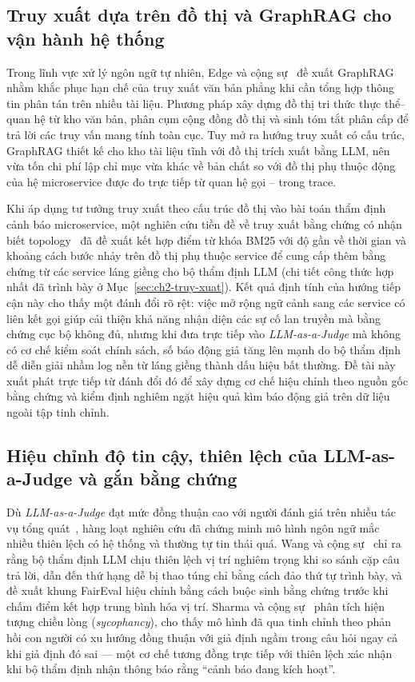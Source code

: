 \subsection{Truy xuất dựa trên đồ thị và GraphRAG cho vận hành hệ thống}
\label{sec:ch3-graphrag}

Trong lĩnh vực xử lý ngôn ngữ tự nhiên, Edge và cộng sự~\cite{edge2024graphrag} đề xuất GraphRAG nhằm khắc phục hạn chế của truy xuất văn bản phẳng khi cần tổng hợp thông tin phân tán trên nhiều tài liệu. Phương pháp xây dựng đồ thị tri thức thực thể--quan hệ từ kho văn bản, phân cụm cộng đồng đồ thị và sinh tóm tắt phân cấp để trả lời các truy vấn mang tính toàn cục. Tuy mở ra hướng truy xuất có cấu trúc, GraphRAG thiết kế cho kho tài liệu tĩnh với đồ thị trích xuất bằng LLM, nên vừa tốn chi phí lập chỉ mục vừa khác về bản chất so với đồ thị phụ thuộc động của hệ microservice được đo trực tiếp từ quan hệ gọi -- trong trace.

Khi áp dụng tư tưởng truy xuất theo cấu trúc đồ thị vào bài toán thẩm định cảnh báo microservice, một nghiên cứu tiền đề về truy xuất bằng chứng có nhận biết topology~\cite{author2026icaetm} đã đề xuất kết hợp điểm từ khóa BM25 với độ gần về thời gian và khoảng cách bước nhảy trên đồ thị phụ thuộc service để cung cấp thêm bằng chứng từ các service láng giềng cho bộ thẩm định LLM (chi tiết công thức hợp nhất đã trình bày ở Mục~\ref{sec:ch2-truy-xuat}). Kết quả định tính của hướng tiếp cận này cho thấy một đánh đổi rõ rệt: việc mở rộng ngữ cảnh sang các service có liên kết gọi giúp cải thiện khả năng nhận diện các sự cố lan truyền mà bằng chứng cục bộ không đủ, nhưng khi đưa trực tiếp vào \emph{LLM-as-a-Judge} mà không có cơ chế kiểm soát chính sách, số báo động giả tăng lên mạnh do bộ thẩm định dễ diễn giải nhầm log nền từ láng giềng thành dấu hiệu bất thường. Đề tài này xuất phát trực tiếp từ đánh đổi đó để xây dựng cơ chế hiệu chỉnh theo nguồn gốc bằng chứng và kiểm định nghiêm ngặt hiệu quả kìm báo động giả trên dữ liệu ngoài tập tinh chỉnh.

\subsection{Hiệu chỉnh độ tin cậy, thiên lệch của LLM-as-a-Judge và gắn bằng chứng}
\label{sec:ch3-calibration}

Dù \emph{LLM-as-a-Judge} đạt mức đồng thuận cao với người đánh giá trên nhiều tác vụ tổng quát~\cite{zheng2023judging}, hàng loạt nghiên cứu đã chứng minh mô hình ngôn ngữ mắc nhiều thiên lệch có hệ thống và thường tự tin thái quá. Wang và cộng sự~\cite{wang2024fair} chỉ ra rằng bộ thẩm định LLM chịu thiên lệch vị trí nghiêm trọng khi so sánh cặp câu trả lời, dẫn đến thứ hạng dễ bị thao túng chỉ bằng cách đảo thứ tự trình bày, và đề xuất khung FairEval hiệu chỉnh bằng cách buộc sinh bằng chứng trước khi chấm điểm kết hợp trung bình hóa vị trí. Sharma và cộng sự~\cite{sharma2024sycophancy} phân tích hiện tượng chiều lòng (\emph{sycophancy}), cho thấy mô hình đã qua tinh chỉnh theo phản hồi con người có xu hướng đồng thuận với giả định ngầm trong câu hỏi ngay cả khi giả định đó sai — một cơ chế tương đồng trực tiếp với thiên lệch xác nhận khi bộ thẩm định nhận thông báo rằng ``cảnh báo đang kích hoạt''.

